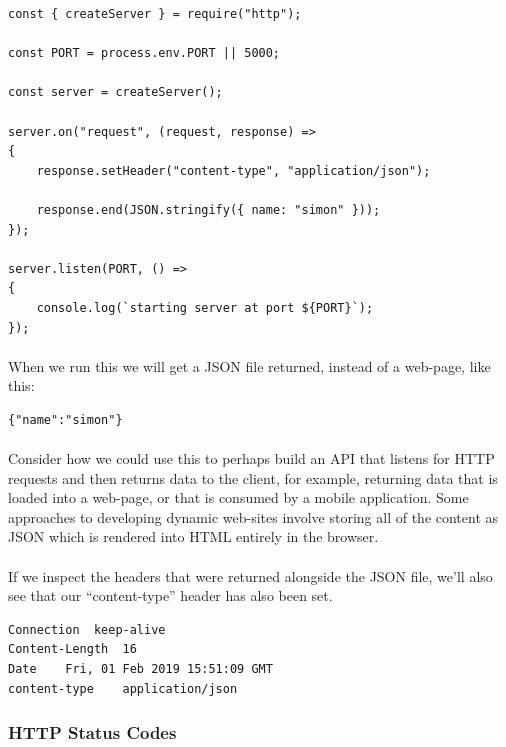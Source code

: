 \documentclass[10pt, a4paper, twosize]{article}
\begin{document}
\begin{lstlisting}
const { createServer } = require("http");

const PORT = process.env.PORT || 5000;

const server = createServer();

server.on("request", (request, response) => 
{
    response.setHeader("content-type", "application/json");

    response.end(JSON.stringify({ name: "simon" }));
});

server.listen(PORT, () => 
{
    console.log(`starting server at port ${PORT}`);
});

\end{lstlisting}

\paragraph{} When we run this we will get a JSON file returned, instead of a web-page, like this:
\begin{lstlisting}
{"name":"simon"}
\end{lstlisting}
\paragraph{} Consider how we could use this to perhaps build an API that listens for HTTP requests and then returns data to the client, for example, returning data that is loaded into a web-page, or that is consumed by a mobile application. Some approaches to developing dynamic web-sites involve storing all of the content as JSON which is rendered into HTML entirely in the browser.

\paragraph{} If we inspect the headers that were returned alongside the JSON file, we'll also see that our ``content-type'' header has also been set.

\begin{lstlisting}
Connection	keep-alive
Content-Length	16
Date	Fri, 01 Feb 2019 15:51:09 GMT
content-type	application/json
\end{lstlisting}


\subsubsection{HTTP Status Codes}
\end{document}
